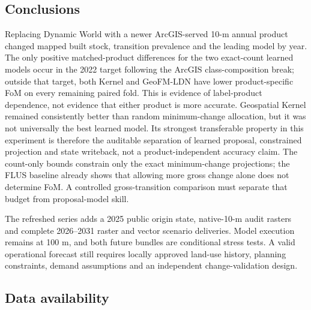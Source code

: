 \subsection{Conclusions}\label{conclusions}

Replacing Dynamic World with a newer ArcGIS-served 10-m annual product
changed mapped built stock, transition prevalence and the leading model
by year. The only positive matched-product differences for the two
exact-count learned models occur in the 2022 target following the ArcGIS
class-composition break; outside that target, both Kernel and GeoFM-LDN
have lower product-specific FoM on every remaining paired fold. This is
evidence of label-product dependence, not evidence that either product
is more accurate. Geospatial Kernel remained consistently better than
random minimum-change allocation, but it was not universally the best
learned model. Its strongest transferable property in this experiment is
therefore the auditable separation of learned proposal, constrained
projection and state writeback, not a product-independent accuracy
claim. The count-only bounds constrain only the exact minimum-change
projections; the FLUS baseline already shows that allowing more gross
change alone does not determine FoM. A controlled gross-transition
comparison must separate that budget from proposal-model skill.

The refreshed series adds a 2025 public origin state, native-10-m audit
rasters and complete 2026--2031 raster and vector scenario deliveries.
Model execution remains at 100 m, and both future bundles are
conditional stress tests. A valid operational forecast still requires
locally approved land-use history, planning constraints, demand
assumptions and an independent change-validation design.

\subsection{Data availability}\label{data-availability}

